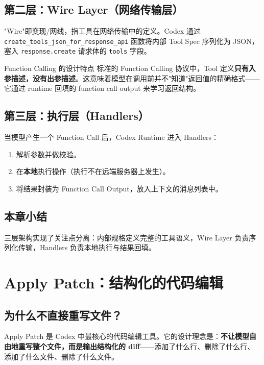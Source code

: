 \documentclass[a4paper]{article}
\begin{document}
\subsection{第二层：Wire Layer（网络传输层）}

"Wire"即变现/网线，指工具在网络传输中的定义。Codex 通过 \texttt{create\_tools\_json\_for\_response\_api} 函数将内部 Tool Spec 序列化为 JSON，塞入 \texttt{response.create} 请求体的 \texttt{tools} 字段。

\begin{knowledgebox}{Function Calling 的设计特点}
标准的 Function Calling 协议中，Tool 定义\textbf{只有入参描述，没有出参描述}。这意味着模型在调用前并不"知道"返回值的精确格式——它通过 runtime 回填的 function call output 来学习返回结构。
\end{knowledgebox}

\subsection{第三层：执行层（Handlers）}

当模型产生一个 Function Call 后，Codex Runtime 进入 Handlers：
\begin{enumerate}
    \item 解析参数并做校验。
    \item 在\textbf{本地}执行操作（执行不在远端服务器上发生）。
    \item 将结果封装为 Function Call Output，放入上下文的消息列表中。
\end{enumerate}

\subsection{本章小结}

三层架构实现了关注点分离：内部规格定义完整的工具语义，Wire Layer 负责序列化传输，Handlers 负责本地执行与结果回填。


\section{Apply Patch：结构化的代码编辑}

\subsection{为什么不直接重写文件？}

Apply Patch 是 Codex 中最核心的代码编辑工具。它的设计理念是：\textbf{不让模型自由地重写整个文件，而是输出结构化的 diff}——添加了什么行、删除了什么行、添加了什么文件、删除了什么文件。
\end{document}
